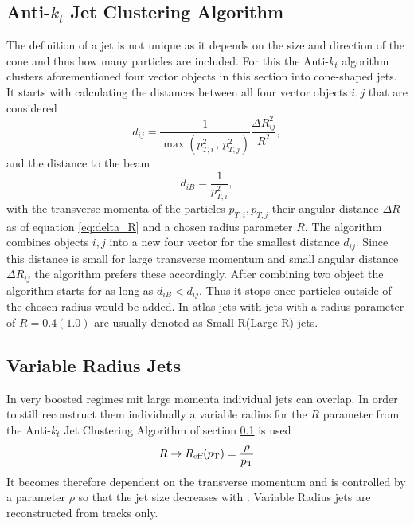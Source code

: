 \subsection{Anti-$k_t$ Jet Clustering Algorithm}\label{sec:anti_kt}
The definition of a jet is not unique as it depends on the size and direction of the cone and thus how many particles are included. For this the Anti-$k_t$ algorithm \citep{cacciari2008anti} clusters aforementioned four vector objects in this section into cone-shaped jets. It starts with calculating the distances between all four vector objects $i,j$ that are considered
\begin{equation}
  d_{ij}=\frac{1}{\max(p_{T,i}^{2}\,,\,p_{T,j}^{2})} \frac{\Delta R_{ij}^2}{R^2},
\end{equation}
and the distance to the beam
\begin{equation}
  d_{iB}=\frac{1}{p_{T,i}^{2}},
\end{equation}
with the transverse momenta of the particles $p_{T,i},p_{T,j}$ their angular distance $\Delta R$ as of equation \ref{eq:delta_R} and a chosen radius parameter $R$. The algorithm combines objects $i,j$ into a new four vector for the smallest distance $d_{ij}$. Since this distance is small for large transverse momentum \pt and small angular distance $\Delta R_{ij}$ the algorithm prefers these accordingly. After combining two object the algorithm starts for as long as $d_{iB}<d_{ij}$. Thus it stops once particles outside of the chosen radius would be added. In \ac{atlas} jets with  jets with a radius parameter of $R=0.4 (1.0)$ are usually denoted as Small-R(Large-R) jets.


\subsection{Variable Radius Jets}\label{sec:vr_jets}
In very boosted regimes mit large momenta individual jets can overlap. In order to still reconstruct them individually a variable radius for the $R$ parameter from the Anti-$k_t$ Jet Clustering Algorithm of section \ref{sec:anti_kt} is used
\begin{equation}
  R\rightarrow R_\text{eff}(p_{\text{T}})=\frac{\rho}{p_{\text{T}}}
\end{equation}
It becomes therefore dependent on the transverse momentum and is controlled by a parameter $\rho$ so that the jet size decreases with \pt. Variable Radius jets are reconstructed from tracks only.

